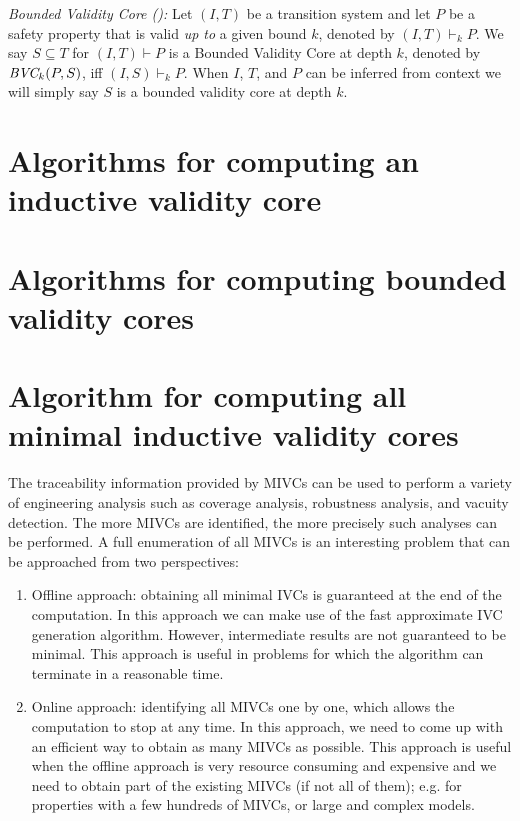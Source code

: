 \begin{definition}{\emph{Bounded Validity Core (\bvc):}}
  \label{def:ivc}
  Let $(I, T)$ be a transition system and let $P$ be a
  safety property that is valid\emph{ up to }a given bound $k$, denoted by $(I, T)\vdash _{k} P$.
  We say $S \subseteq T$ for $(I, T)\vdash P$ is a Bounded Validity Core at depth $k$,
  denoted by $\textit{BVC} _{k}(P, S)$, iff $(I, S) \vdash _{k} P $.
  When $I$, $T$, and $P$ can be inferred from
  context we will simply say $S$ is a bounded validity core at depth $k$.
\end{definition}


\section{Algorithms for computing an inductive validity core}
\label{sec:ivcucalg}



\section{Algorithms for computing bounded validity cores}
\label{sec:bvc}


\section{Algorithm for computing all minimal inductive validity cores}
The traceability information provided by MIVCs can be used to perform a variety of engineering analysis such as coverage analysis, robustness analysis, and vacuity detection.  The more MIVCs are identified, the more precisely such analyses can be performed. A full enumeration of all MIVCs is an interesting problem that can be approached from two perspectives:
\begin{enumerate}
  \item Offline approach: obtaining all minimal IVCs is guaranteed at the end of the computation. In this approach we can make use of the fast approximate IVC generation algorithm. However, intermediate results are not guaranteed to be minimal. This approach is useful in problems for which the algorithm can terminate in a reasonable time.
  \item Online approach: identifying all MIVCs one by one, which allows the computation to stop at any time. In this approach, we need to come up with an efficient way to obtain as many MIVCs as possible. This approach is useful when the offline approach is very resource consuming and expensive and we need to obtain part of the existing MIVCs (if not all of them); e.g. for properties with a few hundreds of MIVCs, or large and complex models.
\end{enumerate}

